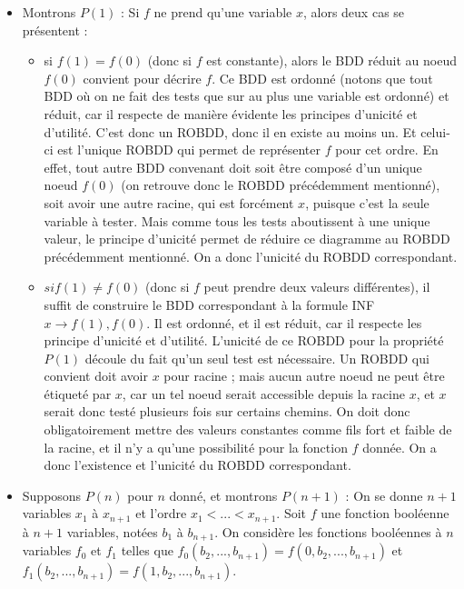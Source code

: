 \documentclass[a4paper,11pt]{article}
\begin{document}
		\begin{itemize}
		\item Montrons $P(1)$ : \newline
		Si $f$ ne prend qu'une variable $x$, alors deux cas se présentent :
			\begin{itemize} 
			\item si $f(1) = f(0)$ (donc si $f$ est constante), alors le BDD réduit au noeud $f(0)$ convient pour décrire $f$. Ce BDD est ordonné (notons que tout BDD où on ne fait des tests que sur au plus une variable est ordonné) et réduit, car il respecte de manière évidente les principes d'unicité et d'utilité. C'est donc un ROBDD, donc il en existe au moins un. Et celui-ci est l'unique ROBDD qui permet de représenter $f$ pour cet ordre. En effet, tout autre BDD convenant doit soit être composé d'un unique noeud $f(0)$ (on retrouve donc le ROBDD précédemment mentionné), soit avoir une autre racine, qui est forcément $x$, puisque c'est la seule variable à tester. Mais comme tous les tests aboutissent à une unique valeur, le principe d'unicité permet de réduire ce diagramme au ROBDD précédemment mentionné. On a donc l'unicité du ROBDD correspondant.
 \item $si f(1) \neq f(0)$ (donc si $f$ peut prendre deux valeurs différentes), il suffit de construire le BDD correspondant à la formule INF $x \rightarrow f(1),f(0)$. Il est ordonné, et il est réduit, car il respecte les principe d'unicité et d'utilité. L'unicité de ce ROBDD pour la propriété $P(1)$ découle du fait qu'un seul test est nécessaire. Un ROBDD qui convient doit avoir $x$ pour racine ; mais aucun autre noeud ne peut être étiqueté par $x$, car un tel noeud serait accessible depuis la racine $x$, et $x$ serait donc testé plusieurs fois sur certains chemins. On doit donc obligatoirement mettre des valeurs constantes comme fils fort et faible de la racine, et il n'y a qu'une possibilité pour la fonction $f$ donnée. On a donc l'existence et l'unicité du ROBDD correspondant.
			\end{itemize}
		\item Supposons $P(n)$ pour $n$ donné, et montrons $P(n+1)$ :
		On se donne $n+1$ variables $x_1$ à $x_{n+1}$ et l'ordre $x_1 < ... < x_{n+1}$.
		Soit $f$ une fonction booléenne à $n+1$ variables, notées $b_1$ à $b_{n+1}$. On considère les fonctions booléennes à $n$ variables $f_0$ et $f_1$ telles que $f_0(b_2,...,b_{n+1}) = f(0,b_2,...,b_{n+1})$ et $f_1(b_2,...,b_{n+1}) = f(1,b_2,...,b_{n+1})$.
		

\end{itemize}
\end{document}
